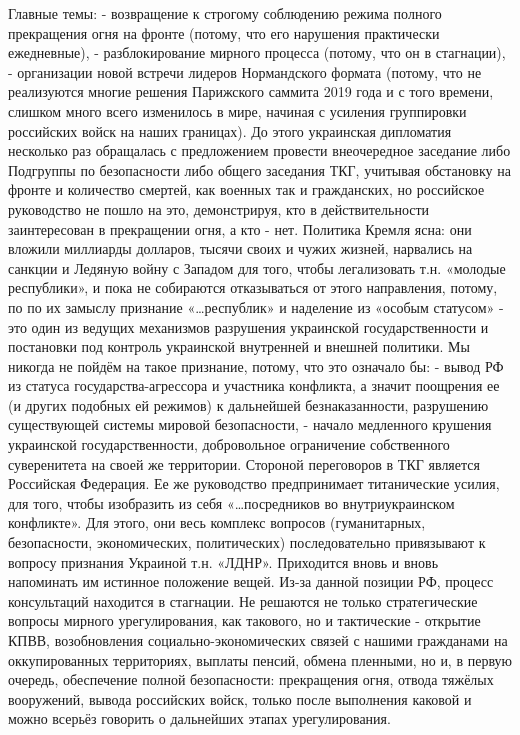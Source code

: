 Главные темы:
- возвращение к строгому соблюдению режима полного прекращения огня на фронте (потому, что его нарушения практически ежедневные),
- разблокирование мирного процесса (потому, что он в стагнации),
- организации новой встречи лидеров Нормандского формата (потому, что не реализуются многие решения Парижского саммита 2019 года и с того времени, слишком много всего изменилось в мире, начиная с усиления группировки российских войск на наших границах). 
До этого украинская дипломатия несколько раз обращалась с предложением провести внеочередное заседание либо Подгруппы по безопасности либо общего заседания ТКГ, учитывая обстановку на фронте и количество смертей, как военных так и гражданских, но российское руководство не пошло на это, демонстрируя, кто в действительности заинтересован в прекращении огня, а кто - нет. 
Политика Кремля ясна: они вложили миллиарды долларов, тысячи своих и чужих жизней, нарвались на санкции и Ледяную войну с Западом для того, чтобы легализовать т.н. «молодые республики», и пока не собираются отказываться от этого направления, потому, по по их замыслу признание «…республик» и наделение из «особым статусом» - это один из ведущих механизмов разрушения украинской государственности и постановки под контроль украинской внутренней и внешней политики.
Мы никогда не пойдём на такое признание, потому, что это означало бы:
- вывод РФ из статуса государства-агрессора и участника конфликта, а значит поощрения ее (и других подобных ей режимов) к дальнейшей безнаказанности, разрушению существующей системы мировой безопасности,
- начало медленного крушения украинской государственности, добровольное ограничение собственного суверенитета на своей же территории.
Стороной переговоров в ТКГ является Российская Федерация.
Ее же руководство предпринимает титанические усилия, для того, чтобы изобразить из себя «…посредников во  внутриукраинском конфликте».
Для этого, они весь комплекс вопросов (гуманитарных, безопасности, экономических, политических) последовательно привязывают к вопросу признания Украиной т.н. «ЛДНР».
Приходится вновь и вновь напоминать им истинное положение вещей.
Из-за данной позиции РФ, процесс консультаций находится в стагнации. 
Не решаются не только стратегические вопросы мирного урегулирования, как такового, но и тактические - открытие КПВВ, возобновления социально-экономических связей с нашими гражданами на оккупированных территориях, выплаты пенсий, обмена пленными, но и, в первую очередь, обеспечение полной безопасности: прекращения огня, отвода тяжёлых вооружений, вывода российских войск, только после выполнения каковой и можно всерьёз говорить о дальнейших этапах урегулирования.
